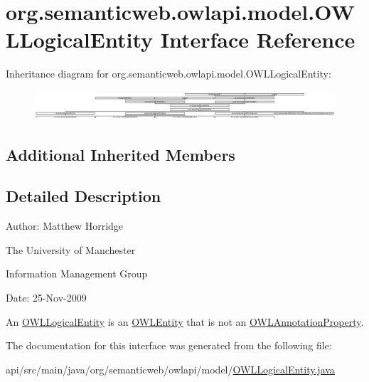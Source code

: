\hypertarget{interfaceorg_1_1semanticweb_1_1owlapi_1_1model_1_1_o_w_l_logical_entity}{\section{org.\-semanticweb.\-owlapi.\-model.\-O\-W\-L\-Logical\-Entity Interface Reference}
\label{interfaceorg_1_1semanticweb_1_1owlapi_1_1model_1_1_o_w_l_logical_entity}
}
Inheritance diagram for org.\-semanticweb.\-owlapi.\-model.\-O\-W\-L\-Logical\-Entity\-:\begin{figure}[H]
\begin{center}
\leavevmode
\includegraphics[height=1.075446cm]{interfaceorg_1_1semanticweb_1_1owlapi_1_1model_1_1_o_w_l_logical_entity}
\end{center}
\end{figure}
\subsection*{Additional Inherited Members}


\subsection{Detailed Description}
Author\-: Matthew Horridge\par
 The University of Manchester\par
 Information Management Group\par
 Date\-: 25-\/\-Nov-\/2009

An {\ttfamily \hyperlink{interfaceorg_1_1semanticweb_1_1owlapi_1_1model_1_1_o_w_l_logical_entity}{O\-W\-L\-Logical\-Entity}} is an {\ttfamily \hyperlink{interfaceorg_1_1semanticweb_1_1owlapi_1_1model_1_1_o_w_l_entity}{O\-W\-L\-Entity}} that is not an {\ttfamily \hyperlink{interfaceorg_1_1semanticweb_1_1owlapi_1_1model_1_1_o_w_l_annotation_property}{O\-W\-L\-Annotation\-Property}}. 

The documentation for this interface was generated from the following file\-:\begin{DoxyCompactItemize}
\item 
api/src/main/java/org/semanticweb/owlapi/model/\hyperlink{_o_w_l_logical_entity_8java}{O\-W\-L\-Logical\-Entity.\-java}\end{DoxyCompactItemize}
